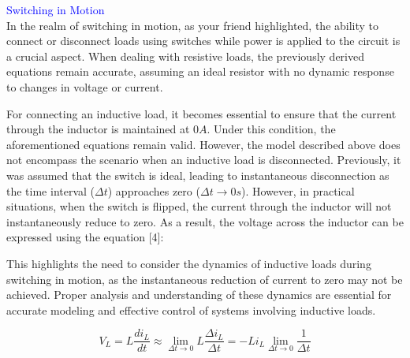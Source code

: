 %

\iffalse
\textcolor{blue}{Switching in Motion}\\

In the realm of switching in motion, as your friend highlighted, the ability to connect or disconnect loads using switches while power is applied to the circuit is a crucial aspect. When dealing with resistive loads, the previously derived equations remain accurate, assuming an ideal resistor with no dynamic response to changes in voltage or current.

For connecting an inductive load, it becomes essential to ensure that the current through the inductor is maintained at $0A$. Under this condition, the aforementioned equations remain valid. However, the model described above does not encompass the scenario when an inductive load is disconnected. Previously, it was assumed that the switch is ideal, leading to instantaneous disconnection as the time interval ($\Delta t$) approaches zero ($\Delta t \to 0s$). However, in practical situations, when the switch is flipped, the current through the inductor will not instantaneously reduce to zero. As a result, the voltage across the inductor can be expressed using the equation [4]:

This highlights the need to consider the dynamics of inductive loads during switching in motion, as the instantaneous reduction of current to zero may not be achieved. Proper analysis and understanding of these dynamics are essential for accurate modeling and effective control of systems involving inductive loads.

\begin{equation}
    V_L=L\frac{di_L}{dt} \approx \lim_{\Delta t \to 0} L\frac{\Delta i_L}{\Delta t}=-Li_L \lim_{\Delta t \to 0} \frac{1}{\Delta t}
\end{equation}\\

